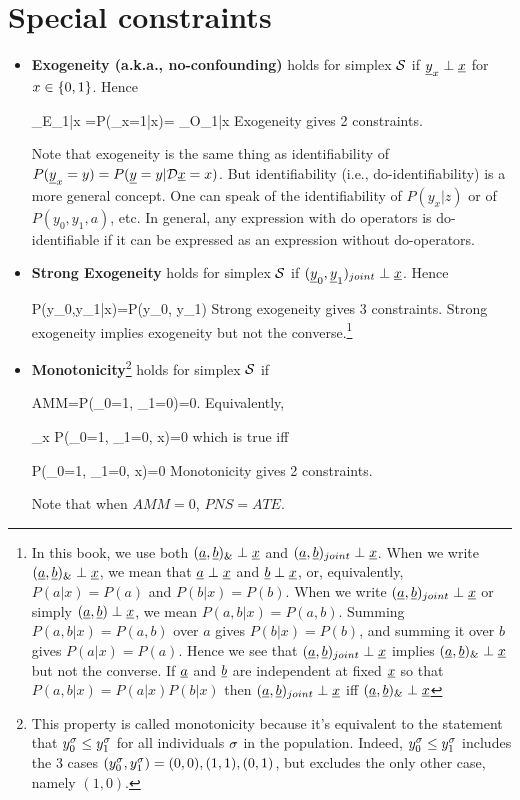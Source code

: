 \section{Special constraints}
\begin{itemize}
\item
{\bf Exogeneity (a.k.a., no-confounding)}
holds for simplex ${\cal S}$
if
${\underline{y}}_x\perp {\underline{x}}$ for $x\in\{0,1\}$.
 Hence

\beq
{}_{E_{1|x}}
=P(\rvy_x=1|x)=
_{O_{1|x}}
\quad {}
\eeq
Exogeneity gives {\color{red}2 constraints}.

Note that exogeneity
is the same thing as identifiability 
of $P({\underline{y}}_x=y)=P({\underline{y}}=y|{\cal D}{\underline{x}}=x)$.
But identifiability
(i.e., do-identifiability) is a more 
general concept. One can speak
of the identifiability of $P(y_x|z)$
or of $P(y_0, y_1, a)$, etc.
In general,
any expression with 
do operators is do-identifiable
if it can be expressed 
as an expression without 
do-operators.

\item
{\bf Strong Exogeneity} holds 
for simplex ${\cal S}$
if $({\underline{y}}_0, {\underline{y}}_1)_{joint}
\perp {\underline{x}}$. Hence

\beq
P(y_0,y_1|x)=P(y_0, y_1)
\label{eq-strong-exogen}
\eeq
Strong exogeneity gives {\color{red} 3 constraints}.
Strong exogeneity implies
exogeneity
but not the converse.\footnote{In
this book, we use both 
$({\underline{a}}, {\underline{b}})_\&\perp {\underline{x}}$
and $({\underline{a}}, {\underline{b}})_{joint}\perp {\underline{x}}$.
When we write $({\underline{a}}, {\underline{b}})_\&\perp {\underline{x}}$,
we mean that
${\underline{a}}\perp {\underline{x}}$
and ${\underline{b}}\perp{\underline{x}}$,
or, equivalently,
$P(a|x)=P(a)$
and $P(b|x)=P(b)$.
When we write
$({\underline{a}}, {\underline{b}})_{joint}\perp {\underline{x}}$
or simply $({\underline{a}}, {\underline{b}})\perp {\underline{x}}$,
we mean $P(a,b|x)=P(a,b)$.
Summing
$P(a,b|x)=P(a,b)$
over $a$ gives
$P(b|x)=P(b)$,
and summing it
over $b$ gives 
$P(a|x)=P(a)$.
Hence we see that
 $({\underline{a}}, {\underline{b}})_{joint}\perp {\underline{x}}$
implies
$({\underline{a}}, {\underline{b}})_\&\perp {\underline{x}}$
but not the converse.
If ${\underline{a}}$ and ${\underline{b}}$ are independent at
fixed ${\underline{x}}$ so that 
$P(a,b|x)=P(a|x)P(b|x)$ then
$({\underline{a}}, {\underline{b}})_{joint}\perp {\underline{x}}$
iff
$({\underline{a}}, {\underline{b}})_\&\perp {\underline{x}}$
}
\item
{\bf Monotonicity}\footnote{
This property is called monotonicity
 because
it's equivalent to the statement
that $y_0^\sigma\leq y_1^\sigma$ for 
all individuals $\sigma$
in the population.
Indeed, $y_0^\sigma\leq y_1^\sigma$
includes the 3 cases $(y_0^\sigma, y_1^\sigma)=
(0,0), (1, 1), (0,1)$, but
excludes the only other
case, namely $(1,0)$.}
 holds for simplex ${\cal S}$ if 

\beq AMM=P(\rvy_0=1,
 \rvy_1=0)=0\eeq\;. 
Equivalently,

\beq
\sum_x P(\rvy_0=1, \rvy_1=0, x)=0
\eeq
which is true iff

\beq
 P(\rvy_0=1, \rvy_1=0, x)=0\quad
{}
\eeq
Monotonicity gives {\color{red} 2 
constraints}.

Note that when $AMM=0$, $PNS=ATE$.
\end{itemize}



